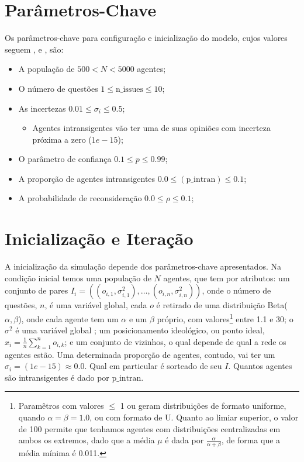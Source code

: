 \section{Parâmetros-Chave}

Os parâmetros-chave para configuração e inicialização do modelo, cujos valores
seguem ,  e
, são:

\begin{itemize}
\item A população de \(500 < N < 5000\) agentes;
\item O número de questões \(1 \leq \text{n\_issues} \leq 10\); 

\item As incertezas \(0.01 \leq \sigma_i \leq 0.5\);
  \begin{itemize}
  \item Agentes intransigentes vão ter uma de suas opiniões com incerteza
    próxima a zero (\(1e-15\));
  \end{itemize}

\item O parâmetro de confiança \(0.1 \leq p \leq 0.99\);
  
\item A proporção de agentes intransigentes \(0.0 \leq (\text{p\_intran}) \leq 0.1\);

\item A probabilidade de reconsideração \(0.0 \leq \rho  \leq 0.1\);
  
\end{itemize}

\section{Inicialização e Iteração}

A inicialização da simulação depende dos parâmetros-chave apresentados. Na
condição inicial temos uma população de \(N\) agentes, que tem por atributos: um
conjunto de pares \(I_i = ((o_{i,1},\sigma_{i,1}^2), \ldots, (o_{i,n},\sigma_{i,n}^2))\), onde
o número de questões, \(n\), é uma variável global, cada \(o\) é retirado de uma
distribuição Beta(\(\alpha,\beta\)), onde cada agente tem um \(\alpha\) e um \(\beta\) próprio,
com valores\footnote{Paramêtros com valores \(\leq\) 1 ou geram distribuições de
  formato uniforme, quando \(\alpha = \beta = 1.0\), ou com formato de U. Quanto ao
  limiar superior, o valor de 100 permite que tenhamos agentes com distribuições
  centralizadas em ambos os extremos, dado que a média \(\mu\) é dada por
  \(\frac{\alpha}{\alpha + \beta}\), de forma que a média mínima é 0.011.} entre 1.1 e 30; o
\(\sigma^2\) é uma variável global ; um posicionamento ideológico, ou ponto ideal,
\(x_i = \frac{1}{n} \sum_{k = 1}^n o_{i,k} \); e um conjunto de vizinhos, o qual
depende de qual a rede os agentes estão. Uma determinada proporção de agentes,
contudo, vai ter um \(\sigma_i = (1e-15 ) \approx 0.0 \). Qual em particular é sorteado de
seu \(I\). Quantos agentes são intransigentes é dado por \(\text{p\_intran}\).

